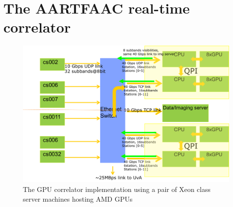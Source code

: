 \documentclass{aa}
\begin{document}
\section {\label{sec:gpucorr} The AARTFAAC real-time correlator}
\begin{figure}[htbp]
\centering
\includegraphics[width=1\textwidth]{Figs/correlator_arch.png}
\caption{The GPU  correlator implementation  using a pair  of Xeon  class server
  machines hosting AMD GPUs}
\label{fig:afaac_station_hw}
\end{figure}
\end{document}
